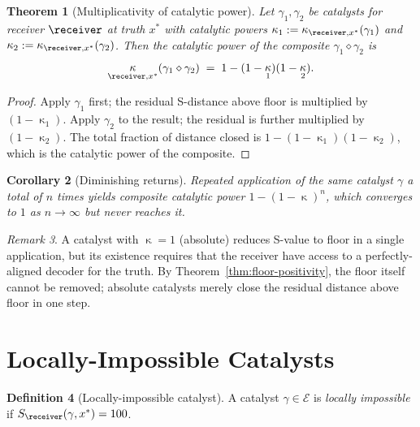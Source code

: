 \documentclass[11pt,a4paper]{article}
\theoremstyle{thmstyle}
\newtheorem{theorem}{Theorem}[section]
\newtheorem{corollary}[theorem]{Corollary}
\theoremstyle{thmstyle}
\theoremstyle{definition}
\newtheorem{definition}[theorem]{Definition}
\theoremstyle{remark}
\newtheorem{remark}[theorem]{Remark}
\DeclareMathOperator{\catpow}{\kappa}
\newcommand{\Expr}{\mathcal{E}}
\newcommand{\Sscalar}{S}
\begin{document}
\begin{theorem}[Multiplicativity of catalytic power]
\label{thm:mult-cat-power}
Let $\gamma_{1}, \gamma_{2}$ be catalysts for receiver
$\receiver$ at truth $x^{*}$ with catalytic powers
$\catpow_{1} := \catpow_{\receiver, x^{*}}(\gamma_{1})$
and $\catpow_{2} := \catpow_{\receiver, x^{*}}(\gamma_{2})$.
Then the catalytic power of the composite
$\gamma_{1} \diamond \gamma_{2}$ is
\[
\catpow_{\receiver, x^{*}}(\gamma_{1} \diamond \gamma_{2})
\;=\; 1 - (1 - \catpow_{1})(1 - \catpow_{2}).
\]
\end{theorem}

\begin{proof}
Apply $\gamma_{1}$ first; the residual S-distance
above floor is multiplied by $(1 - \catpow_{1})$.
Apply $\gamma_{2}$ to the result; the residual is
further multiplied by $(1 - \catpow_{2})$.  The total
fraction of distance closed is
$1 - (1 - \catpow_{1})(1 - \catpow_{2})$, which is the
catalytic power of the composite.
\end{proof}

\begin{corollary}[Diminishing returns]\label{cor:diminishing-returns}
Repeated application of the same catalyst $\gamma$ a
total of $n$ times yields composite catalytic power
$1 - (1 - \catpow)^{n}$, which converges to
$1$ as $n \to \infty$ but never reaches it.
\end{corollary}

\begin{remark}\label{rem:perfect-catalyst}
A catalyst with $\catpow = 1$ (absolute) reduces
S-value to floor in a single application, but its
existence requires that the receiver have access to
a perfectly-aligned decoder for the truth.  By
Theorem~\ref{thm:floor-positivity}, the floor itself
cannot be removed; absolute catalysts merely close
the residual distance above floor in one step.
\end{remark}

\section{Locally-Impossible Catalysts}
\label{sec:locally-impossible}

\begin{definition}[Locally-impossible catalyst]
\label{def:loc-imp-cat}
A catalyst $\gamma \in \Expr$ is
\emph{locally impossible} if
$\Sscalar_{\receiver}(\gamma, x^{*}) = 100$.
\end{definition}
\end{document}
